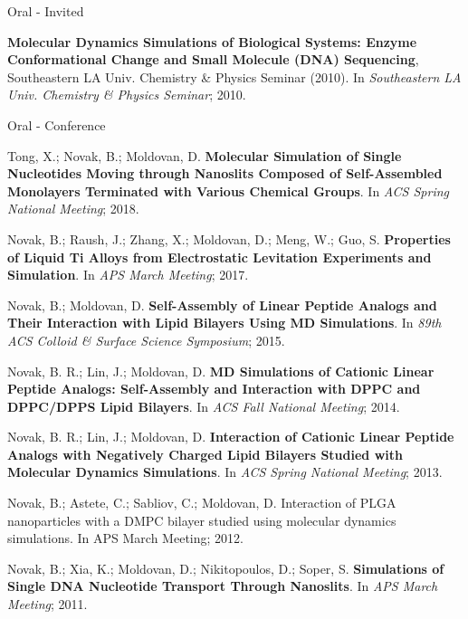 \pagebreak


\begin{cventries}
  \cventry
    {} %
    {Oral - Invited} %
    {} %
    {} %
    {
      \begin{cvitems} %
        \item {\textbf{Molecular Dynamics Simulations of Biological Systems: Enzyme Conformational Change and Small Molecule (DNA) Sequencing}, Southeastern LA Univ. Chemistry \& Physics Seminar (2010). In \textit{Southeastern LA Univ. Chemistry \& Physics Seminar}; 2010.}
      \end{cvitems}
    }
    
  \cventry
    {} %
    {Oral - Conference} %
    {} %
    {} %
    {
      \begin{cvitems} 
        \item {Tong, X.; Novak, B.; Moldovan, D. \textbf{Molecular Simulation of Single Nucleotides Moving through Nanoslits Composed of Self-Assembled Monolayers Terminated with Various Chemical Groups}. In \textit{ACS Spring National Meeting}; 2018.}
        \item {Novak, B.; Raush, J.; Zhang, X.; Moldovan, D.; Meng, W.; Guo, S. \textbf{Properties of Liquid Ti Alloys from Electrostatic Levitation Experiments and Simulation}. In \textit{APS March Meeting}; 2017.}
        \item {Novak, B.; Moldovan, D. \textbf{Self-Assembly of Linear Peptide Analogs and Their Interaction with Lipid Bilayers Using MD Simulations}. In \textit{89th ACS Colloid \& Surface Science Symposium}; 2015.}
        \item {Novak, B. R.; Lin, J.; Moldovan, D. \textbf{MD Simulations of Cationic Linear Peptide Analogs: Self-Assembly and Interaction with DPPC and DPPC/DPPS Lipid Bilayers}. In \textit{ACS Fall National Meeting}; 2014.}
        \item {Novak, B. R.; Lin, J.; Moldovan, D. \textbf{Interaction of Cationic Linear Peptide Analogs with Negatively Charged Lipid Bilayers Studied with Molecular Dynamics Simulations}. In \textit{ACS Spring National Meeting}; 2013.}
        \item {Novak, B.; Astete, C.; Sabliov, C.; Moldovan, D. Interaction of PLGA nanoparticles with a DMPC bilayer studied using molecular dynamics simulations. In APS March Meeting; 2012.}
        \item {Novak, B.; Xia, K.; Moldovan, D.; Nikitopoulos, D.; Soper, S. \textbf{Simulations of Single DNA Nucleotide Transport Through Nanoslits}. In \textit{APS March Meeting}; 2011.}

\end{cvitems}}
\end{cventries}
